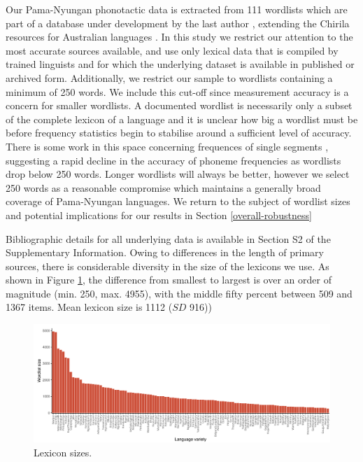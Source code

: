 Our Pama-Nyungan phonotactic data is extracted from 111 wordlists which are part of a database under development by the last author \autocite{round_ausphon-lexicon_2017}, extending the Chirila resources for Australian languages \autocite{bowern_chirila:_2016}. In this study we restrict our attention to the most accurate sources available, and use only lexical data that is compiled by trained linguists and for which the underlying dataset is available in published or archived form. Additionally, we restrict our sample to wordlists containing a minimum of 250 words. We include this cut-off since measurement accuracy is a concern for smaller wordlists. A documented wordlist is necessarily only a subset of the complete lexicon of a language and it is unclear how big a wordlist must be before frequency statistics begin to stabilise around a sufficient level of accuracy. There is some work in this space concerning frequences of single segments \autocite{dockum_swadesh_2019}, suggesting a rapid decline in the accuracy of phoneme frequencies as wordlists drop below 250 words. Longer wordlists will always be better, however we select 250 words as a reasonable compromise which maintains a generally broad coverage of Pama-Nyungan languages. We return to the subject of wordlist sizes and potential implications for our results in Section \ref{overall-robustness}

Bibliographic details for all underlying data is available in Section S2 of the Supplementary Information. Owing to differences in the length of primary sources, there is considerable diversity in the size of the lexicons we use. As shown in Figure \ref{fig:lex-size}, the difference from smallest to largest is over an order of magnitude (min. 250, max. 4955), with the middle fifty percent between 509 and 1367 items. Mean lexicon size is 1112 (\(SD\) 916))

\begin{figure}

{\centering \includegraphics[width=1\linewidth]{05-phylo-signal/fig/wordlist_sizes} 

}

\caption{Lexicon sizes.}\label{fig:lex-size}
\end{figure}

